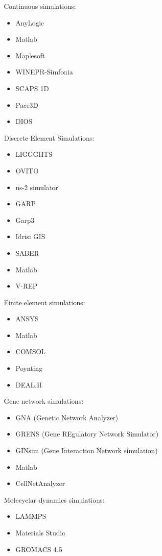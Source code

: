 \documentclass[utf8]{gradu3}
\begin{document}
Continuous simulations:
\begin{itemize}
    \item AnyLogic
    \item Matlab
    \item Maplesoft
    \item WINEPR-Simfonia
    \item SCAPS 1D
    \item Pace3D
    \item DIOS
\end{itemize}

Discrete Element Simulations:
\begin{itemize}
    \item LIGGGHTS 
    \item OVITO
    \item ns-2 simulator
    \item GARP
    \item Garp3
    \item Idrisi GIS
    \item SABER
    \item Matlab
    \item V-REP
\end{itemize}

Finite element simulations:
\begin{itemize}
    \item ANSYS
    \item Matlab
    \item COMSOL
    \item Poynting
    \item DEAL.II
\end{itemize}

Gene network simulations:
\begin{itemize}
    \item GNA (Genetic Network Analyzer) 
    \item GRENS (Gene REgulatory Network Simulator)
    \item GINsim (Gene Interaction Network simulation)
    \item Matlab
    \item CellNetAnalyzer
\end{itemize}


Molecyclar dynamics simulations:
\begin{itemize}
    \item LAMMPS
    \item Materials Studio
    \item GROMACS 4.5
\end{itemize}
\end{document}
